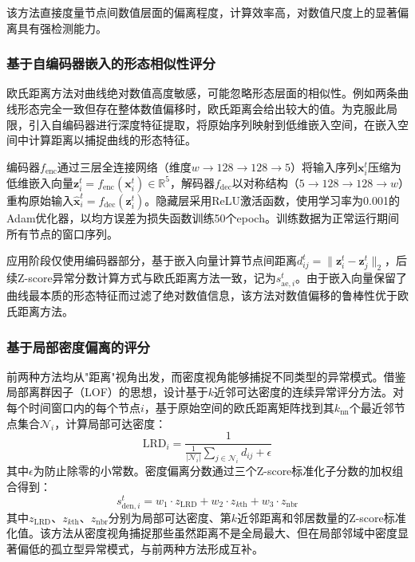 \documentclass[10.5pt,a4paper,twocolumn]{ctexart}
\begin{document}
该方法直接度量节点间数值层面的偏离程度，计算效率高，对数值尺度上的显著偏离具有强检测能力。

\subsubsection{基于自编码器嵌入的形态相似性评分}

欧氏距离方法对曲线绝对数值高度敏感，可能忽略形态层面的相似性。例如两条曲线形态完全一致但存在整体数值偏移时，欧氏距离会给出较大的值。为克服此局限，引入自编码器进行深度特征提取，将原始序列映射到低维嵌入空间，在嵌入空间中计算距离以捕捉曲线的形态特征。

编码器$f_{\text{enc}}$通过三层全连接网络（维度$w \to 128 \to 128 \to 5$）将输入序列$\mathbf{x}_i^t$压缩为低维嵌入向量$\mathbf{z}_i^t = f_{\text{enc}}(\mathbf{x}_i^t) \in \mathbb{R}^5$，解码器$f_{\text{dec}}$以对称结构（$5 \to 128 \to 128 \to w$）重构原始输入$\hat{\mathbf{x}}_i^t = f_{\text{dec}}(\mathbf{z}_i^t)$。隐藏层采用ReLU激活函数，使用学习率为0.001的Adam优化器，以均方误差为损失函数训练50个epoch。训练数据为正常运行期间所有节点的窗口序列。

应用阶段仅使用编码器部分，基于嵌入向量计算节点间距离$d_{ij}^t = \|\mathbf{z}_i^t - \mathbf{z}_j^t\|_2$，后续Z-score异常分数计算方式与欧氏距离方法一致，记为$s_{\text{ae},i}^t$。由于嵌入向量保留了曲线最本质的形态特征而过滤了绝对数值信息，该方法对数值偏移的鲁棒性优于欧氏距离方法。

\subsubsection{基于局部密度偏离的评分}

前两种方法均从"距离"视角出发，而密度视角能够捕捉不同类型的异常模式。借鉴局部离群因子（LOF）\cite{breunig2000lof}的思想，设计基于$k$近邻可达密度的连续异常评分方法。对每个时间窗口内的每个节点$i$，基于原始空间的欧氏距离矩阵找到其$k_{\text{nn}}$个最近邻节点集合$\mathcal{N}_i$，计算局部可达密度：
\begin{equation}
    \text{LRD}_i = \frac{1}{\frac{1}{|\mathcal{N}_i|}\sum_{j \in \mathcal{N}_i} d_{ij} + \epsilon}
\end{equation}
其中$\epsilon$为防止除零的小常数。密度偏离分数通过三个Z-score标准化子分数的加权组合得到：
\begin{equation}\label{eq:density_score}
    s_{\text{den},i}^t = w_1 \cdot z_{\text{LRD}} + w_2 \cdot z_{k\text{th}} + w_3 \cdot z_{\text{nbr}}
\end{equation}
其中$z_{\text{LRD}}$、$z_{k\text{th}}$、$z_{\text{nbr}}$分别为局部可达密度、第$k$近邻距离和邻居数量的Z-score标准化值。该方法从密度视角捕捉那些虽然距离不是全局最大、但在局部邻域中密度显著偏低的孤立型异常模式，与前两种方法形成互补。
\end{document}
